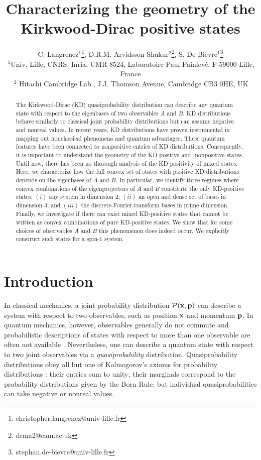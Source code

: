 \documentclass[a4paper, notitlepage, 11pt]{article}
\title{Characterizing the geometry of the Kirkwood-Dirac positive states}
\author{C. Langrenez$^1$\thanks{christopher.langrenez@univ-lille.fr}, D.R.M. Arvidsson-Shukur$^2$\thanks{drma2@cam.ac.uk}, S. De Bi\`evre$^1$\thanks{stephan.de-bievre@univ-lille.fr}\\
$\,^1$Univ. Lille, CNRS, Inria, UMR 8524, Laboratoire Paul Painlev\'e, F-59000 Lille, France\\
$\,^2$ Hitachi Cambridge Lab., J.J. Thomson Avenue, Cambridge CB3 0HE, UK 
}
\numberwithin{equation}{section}
\begin{document}
\maketitle

\begin{abstract}

The Kirkwood-Dirac (KD) quasiprobability distribution can describe any quantum state with respect to the eigenbases of two  observables $A$ and $B$. KD distributions behave similarly to classical joint probability distributions but can assume negative and nonreal values. In recent years, KD distributions have proven instrumental in mapping out nonclassical phenomena and quantum advantages. These quantum features have been connected to nonpositive entries of KD distributions. Consequently, it is important to understand the geometry of the KD-positive and -nonpositive states. Until now, there has been no thorough analysis of the KD positivity of mixed states. Here, we characterize how the full convex set of states with positive KD distributions depends on the eigenbases of $A$ and $B$. In particular, we identify three regimes where convex combinations of the eigenprojectors of $A$ and $B$ constitute the only KD-positive states: $(i)$ any system in dimension $2$; $(ii)$ an open and dense set of bases in dimension $3$; and $(iii)$ the discrete-Fourier-transform bases in prime dimension. Finally, we investigate if there can exist mixed KD-positive states that cannot be written as convex combinations of pure KD-positive states. We show that for some choices of observables $A$ and $B$ this phenomenon does indeed occur. We explicitly construct such states for a spin-$1$ system.


\end{abstract}
\section{Introduction}


In classical mechanics,  a joint probability distribution $\mathcal{P}(\bf{x}, \bf{p})$ can describe a system with respect to two observables, such as position $\bf{x}$ and momentum $\bf{p}$. In quantum mechanics, however, observables generally do not commute and probabilistic descriptions of states with respect to more than one observable are often not available \cite{wigner1932,hudson1974, cohen1966, srinivaswolf1975, hartle2004, allahverdyan2015}.  
Nevertheless, one can describe a quantum state with respect to two joint observables via a \textit{quasiprobability} distribution.   Quasiprobability distributions obey all but one of Kolmogorov's axioms for probability distributions \cite{brookeskolmogorov1951}: their entries sum to unity;  their marginals correspond to the probability distributions given by the Born Rule; but individual quasiprobabilities can take negative or  nonreal values.  
\end{document}
